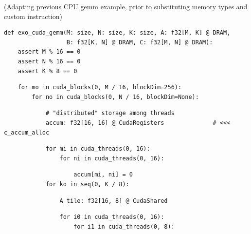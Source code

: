\begin{minipage}[t]{0.5\textwidth}\codeminipage
(Adapting previous CPU gemm example, prior to substituting memory types and custom instruction)
\vspace{6mm}
{\tiny
\begin{verbatim}
def exo_cuda_gemm(M: size, N: size, K: size, A: f32[M, K] @ DRAM,
                  B: f32[K, N] @ DRAM, C: f32[M, N] @ DRAM):
    assert M % 16 == 0
    assert N % 16 == 0
    assert K % 8 == 0
\end{verbatim}
\begin{mdframed}[style=MyFrame, backgroundcolor=redBoxBg]
\color{redBoxFg}
\begin{verbatim}
    for mo in cuda_blocks(0, M / 16, blockDim=256):
        for no in cuda_blocks(0, N / 16, blockDim=None):
\end{verbatim}
\end{mdframed}
\begin{mdframed}[style=MyFrame, backgroundcolor=yellowBoxBg]
\color{yellowBoxFg}
\begin{verbatim}
            # "distributed" storage among threads
            accum: f32[16, 16] @ CudaRegisters              # <<< c_accum_alloc
\end{verbatim}
\end{mdframed}
\begin{mdframed}[style=MyFrame, backgroundcolor=blueBoxBg]
\color{blueBoxFg}
\begin{verbatim}
            for mi in cuda_threads(0, 16):
                for ni in cuda_threads(0, 16):
\end{verbatim}
\end{mdframed}
\begin{verbatim}
                    accum[mi, ni] = 0
            for ko in seq(0, K / 8):
\end{verbatim}
\begin{mdframed}[style=MyFrame, backgroundcolor=yellowBoxBg]
\color{yellowBoxFg}
\begin{verbatim}
                A_tile: f32[16, 8] @ CudaShared
\end{verbatim}
\end{mdframed}
\begin{mdframed}[style=MyFrame, backgroundcolor=blueBoxBg]
\color{blueBoxFg}
\begin{verbatim}
                for i0 in cuda_threads(0, 16):
                    for i1 in cuda_threads(0, 8):
\end{verbatim}
\end{mdframed}
}
\end{minipage}
